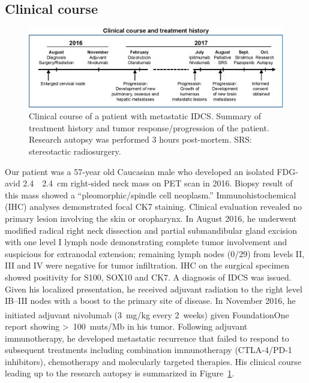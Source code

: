 \subsection{Clinical course}
\begin{figure}[htp]
    \begin{center}
        \includegraphics[width=\textwidth,keepaspectratio]{images/303/clinical_course}
    \end{center}
    \vspace{-0.3cm}
    \caption[Clinical course of a patient with metastatic IDCS.]{Clinical course of a patient with metastatic IDCS. Summary of treatment history and tumor response/progression of the patient. Research autopsy was performed 3 hours post-mortem. SRS: stereotactic radiosurgery.}
    \label{fig:303:clinical_course}
\end{figure}
Our patient was a 57-year old Caucasian male who developed an isolated FDG-avid 2.4~\texttimes{}~2.4~cm right-sided neck mass on PET scan in 2016. Biopsy result of this mass showed a ``pleomorphic\slash{}spindle cell neoplasm.'' Immunohistochemical (IHC) analyses demonstrated focal CK7 staining. Clinical evaluation revealed no primary lesion involving the skin or oropharynx. In August 2016, he underwent modified radical right neck dissection and partial submandibular gland excision with one level I lymph node demonstrating complete tumor involvement and suspicious for extranodal extension; remaining lymph nodes (0/29) from levels II, III and IV were negative for tumor infiltration. IHC on the surgical specimen showed positivity for S100, SOX10 and CK7. A diagnosis of IDCS was issued. Given his localized presentation, he received adjuvant radiation to the right level IB--III nodes with a boost to the primary site of disease. In November 2016, he initiated adjuvant nivolumab (3~mg/kg every 2~weeks) given FoundationOne\textsuperscript\textregistered{} report showing \textgreater{}~100~muts/Mb in his tumor. Following adjuvant immunotherapy, he developed metastatic recurrence that failed to respond to subsequent treatments including combination immunotherapy (CTLA-4/PD-1 inhibitors), chemotherapy and molecularly targeted therapies.  His clinical course leading up to the research autopsy is summarized in Figure~\ref{fig:303:clinical_course}.

